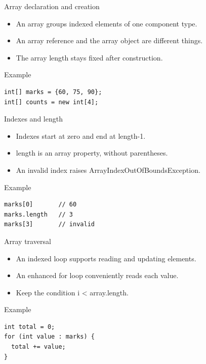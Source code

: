 \documentclass[10pt,aspectratio=169]{beamer}
\begin{document}
\begin{frame}[fragile,t]{Array declaration and creation}
\begin{itemize}
\item An array groups indexed elements of one component type.
\item An array reference and the array object are different things.
\item The array length stays fixed after construction.
\end{itemize}
\vspace{1mm}\begin{block}{Example}
\begin{lstlisting}
int[] marks = {60, 75, 90};
int[] counts = new int[4];
\end{lstlisting}
\end{block}
\end{frame}

\begin{frame}[fragile,t]{Indexes and length}
\begin{itemize}
\item Indexes start at zero and end at length-1.
\item length is an array property, without parentheses.
\item An invalid index raises ArrayIndexOutOfBoundsException.
\end{itemize}
\vspace{1mm}\begin{block}{Example}
\begin{lstlisting}
marks[0]       // 60
marks.length   // 3
marks[3]       // invalid
\end{lstlisting}
\end{block}
\end{frame}

\begin{frame}[fragile,t]{Array traversal}
\begin{itemize}
\item An indexed loop supports reading and updating elements.
\item An enhanced for loop conveniently reads each value.
\item Keep the condition i \textless{} array.length.
\end{itemize}
\vspace{1mm}\begin{block}{Example}
\begin{lstlisting}
int total = 0;
for (int value : marks) {
  total += value;
}
\end{lstlisting}
\end{block}
\end{frame}
\end{document}
